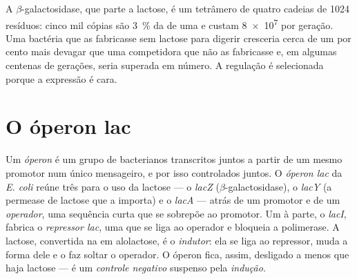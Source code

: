 \begin{example}\label{ex:b1:expression-control:economy}
A  $\beta$-galactosidase, que parte a lactose, é um tetrâmero de
quatro cadeias de \qty{1024}{} resíduos: cinco mil cópias são
\qty{3}{\%} da  de uma  e custam \qty{8e7}{}  por
geração. Uma bactéria que as fabricasse sem lactose para digerir
cresceria cerca de um por cento mais devagar que uma competidora que
não as fabricasse e, em algumas centenas de gerações, seria superada em
número. A regulação é selecionada porque a expressão é cara.
\end{example}

\section{O óperon lac}

\begin{definition}\label{def:b1:expression-control:operon}
Um \emph{óperon} é um grupo de  bacterianos transcritos juntos a
partir de um mesmo promotor num único mensageiro, e por isso
controlados juntos. O \emph{óperon lac} da \emph{E. coli} reúne três
 para o uso da lactose --- o \emph{lacZ}
($\beta$-galactosidase), o \emph{lacY} (a permease de lactose que a
importa) e o \emph{lacA} --- atrás de um promotor e de um
\emph{operador}, uma sequência curta que se sobrepõe ao promotor. Um
 à parte, o \emph{lacI}, fabrica o \emph{repressor lac}, uma
 que se liga ao operador e bloqueia a polimerase. A lactose,
convertida na  em alolactose, é o \emph{indutor}: ela se liga ao
repressor, muda a forma dele e o faz soltar o operador. O óperon fica,
assim, desligado a menos que haja lactose --- é um \emph{controle
negativo} suspenso pela \emph{indução}.
\end{definition}

